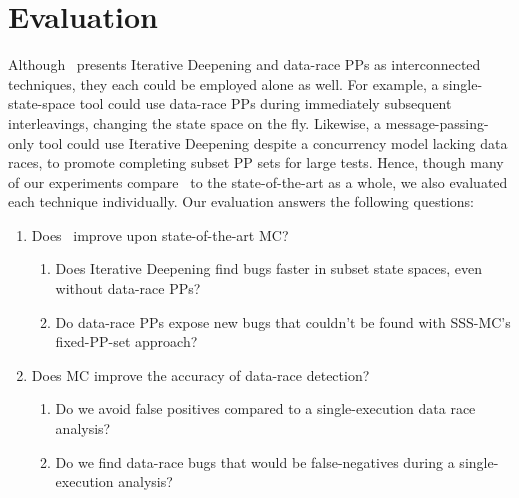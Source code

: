 \section{Evaluation}
\label{sec:eval}

Although \quicksand~presents Iterative Deepening and data-race PPs as interconnected techniques, they each could be employed alone as well. %
For example, a single-state-space tool could use data-race PPs during immediately subsequent interleavings,
changing the state space on the fly.
Likewise, a message-passing-only tool could use Iterative Deepening despite a concurrency model lacking data races, %
to promote completing subset PP sets for large tests.
Hence, though many of our experiments compare \quicksand~to the state-of-the-art as a whole,
we also evaluated each technique individually.
Our evaluation answers the following questions:
\begin{enumerate}

	\item Does \quicksand~improve upon state-of-the-art MC?
		\begin{enumerate}
			\item Does Iterative Deepening find bugs faster
				in subset state spaces, even without data-race PPs?
			\item Do data-race PPs expose new bugs that couldn't be found with SSS-MC's fixed-PP-set approach?
		\end{enumerate}
	\item Does MC improve the accuracy of data-race detection?
		\begin{enumerate}
			\item Do we avoid false positives compared to a single-execution data race analysis?
			\item Do we find data-race bugs that would be false-negatives during a single-execution analysis?%
		\end{enumerate}
\end{enumerate}

